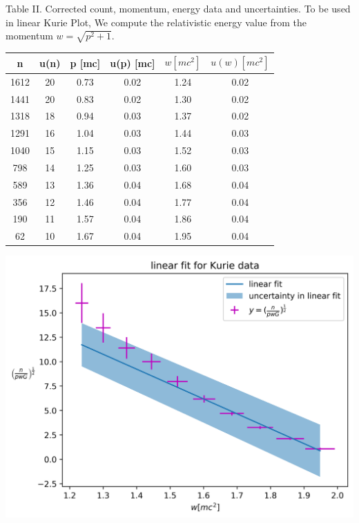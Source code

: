 \documentclass[10pt, a4paper]{article}
\newenvironment{Figure}
    {\par\medskip\noindent\minipage{\linewidth}}
    {\endminipage\par\medskip}
\begin{document}
\begin{multicols}{2}
Table II. Corrected count, momentum, energy data and uncertainties.
To be used in linear Kurie Plot, We compute the relativistic energy value from the momentum $w = \sqrt{p^2 + 1}$.
\begin{tabular}{ c c c c c c }
\hline
\hline
n & u(n) & p [mc] & u(p) [mc] & $w [mc^2]$ & $u(w) [mc^2]$ \\
\hline
1612 &  20 & 0.73 & 0.02 & 1.24 & 0.02 \\
1441 &  20 & 0.83 & 0.02 & 1.30 & 0.02 \\
1318 &  18 & 0.94 & 0.03 & 1.37 & 0.02 \\
1291 &  16 & 1.04 & 0.03 & 1.44 & 0.03 \\
1040 &  15 & 1.15 & 0.03 & 1.52 & 0.03 \\
798 &  14 & 1.25 & 0.03 & 1.60 & 0.03 \\
589 &  13 & 1.36 & 0.04 & 1.68 & 0.04 \\
356 &  12 & 1.46 & 0.04 & 1.77 & 0.04 \\
190 &  11 & 1.57 & 0.04 & 1.86 & 0.04 \\
62 &  10 & 1.67 & 0.04 & 1.95 & 0.04 \\
\hline
\hline
\end{tabular}

\begin{Figure}
 \centering
 \includegraphics[width=\linewidth]{Kurie_linear_data_plot.png}
\end{Figure}


\end{multicols}
\end{document}

